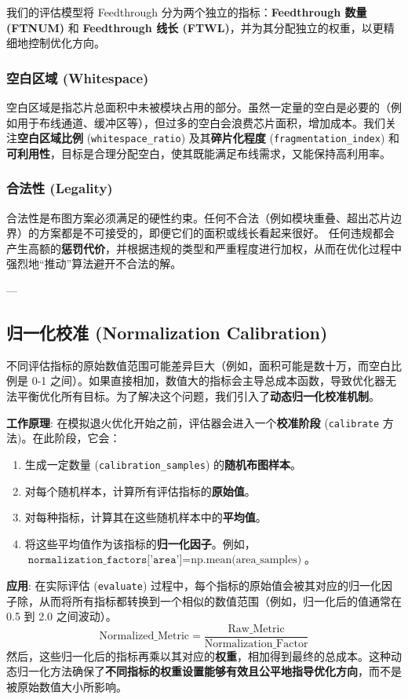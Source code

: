 \documentclass[conference]{IEEEtran}
\begin{document}
我们的评估模型将 Feedthrough 分为两个独立的指标：\textbf{Feedthrough 数量 (FTNUM)} 和 \textbf{Feedthrough 线长 (FTWL)}，并为其分配独立的权重，以更精细地控制优化方向。

\subsubsection{空白区域 (Whitespace)}
空白区域是指芯片总面积中未被模块占用的部分。虽然一定量的空白是必要的（例如用于布线通道、缓冲区等），但过多的空白会浪费芯片面积，增加成本。我们关注\textbf{空白区域比例} (\texttt{whitespace\_ratio}) 及其\textbf{碎片化程度} (\texttt{fragmentation\_index}) 和\textbf{可利用性}，目标是合理分配空白，使其既能满足布线需求，又能保持高利用率。

\subsubsection{合法性 (Legality)}
合法性是布图方案必须满足的硬性约束。任何不合法（例如模块重叠、超出芯片边界）的方案都是不可接受的，即便它们的面积或线长看起来很好。
任何违规都会产生高额的\textbf{惩罚代价}，并根据违规的类型和严重程度进行加权，从而在优化过程中强烈地“推动”算法避开不合法的解。

---

\subsection{归一化校准 (Normalization Calibration)}
不同评估指标的原始数值范围可能差异巨大（例如，面积可能是数十万，而空白比例是 0-1 之间）。如果直接相加，数值大的指标会主导总成本函数，导致优化器无法平衡优化所有目标\cite{Deb2011}。为了解决这个问题，我们引入了\textbf{动态归一化校准机制}。

\textbf{工作原理}:
在模拟退火优化开始之前，评估器会进入一个\textbf{校准阶段} (\texttt{calibrate} 方法)。在此阶段，它会：
\begin{enumerate}
    \item 生成一定数量 (\texttt{calibration\_samples}) 的\textbf{随机布图样本}。
    \item 对每个随机样本，计算所有评估指标的\textbf{原始值}。
    \item 对每种指标，计算其在这些随机样本中的\textbf{平均值}。
    \item 将这些平均值作为该指标的\textbf{归一化因子}。例如，$\texttt{normalization\_factors['area']} = \text{np.mean(area\_samples)}$。
\end{enumerate}

\textbf{应用}:
在实际评估 (\texttt{evaluate}) 过程中，每个指标的原始值会被其对应的归一化因子除，从而将所有指标都转换到一个相似的数值范围（例如，归一化后的值通常在 0.5 到 2.0 之间波动）。
$$ \text{Normalized\_Metric} = \frac{\text{Raw\_Metric}}{\text{Normalization\_Factor}} $$
然后，这些归一化后的指标再乘以其对应的\textbf{权重}，相加得到最终的总成本。这种动态归一化方法确保了\textbf{不同指标的权重设置能够有效且公平地指导优化方向}，而不是被原始数值大小所影响。
\end{document}
